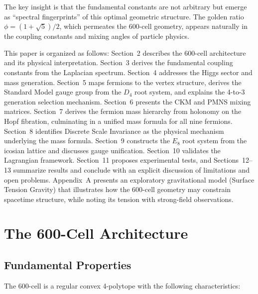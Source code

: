 \documentclass[12pt,a4paper]{article}
\begin{document}
The key insight is that the fundamental constants are not arbitrary but emerge as ``spectral fingerprints'' of this optimal geometric structure. The golden ratio $\phi = (1+\sqrt{5})/2$, which permeates the 600-cell geometry, appears naturally in the coupling constants and mixing angles of particle physics.

This paper is organized as follows: Section~2 describes the 600-cell architecture and its physical interpretation. Section~3 derives the fundamental coupling constants from the Laplacian spectrum. Section~4 addresses the Higgs sector and mass generation. Section~5 maps fermions to the vertex structure, derives the Standard Model gauge group from the $D_4$ root system, and explains the 4-to-3 generation selection mechanism. Section~6 presents the CKM and PMNS mixing matrices. Section~7 derives the fermion mass hierarchy from holonomy on the Hopf fibration, culminating in a unified mass formula for all nine fermions. Section~8 identifies Discrete Scale Invariance as the physical mechanism underlying the mass formula. Section~9 constructs the $E_8$ root system from the icosian lattice and discusses gauge unification. Section~10 validates the Lagrangian framework. Section~11 proposes experimental tests, and Sections~12--13 summarize results and conclude with an explicit discussion of limitations and open problems. Appendix~A presents an exploratory gravitational model (Surface Tension Gravity) that illustrates how the 600-cell geometry may constrain spacetime structure, while noting its tension with strong-field observations.

\section{The 600-Cell Architecture}

\subsection{Fundamental Properties}

The 600-cell is a regular convex 4-polytope with the following characteristics:
\end{document}
